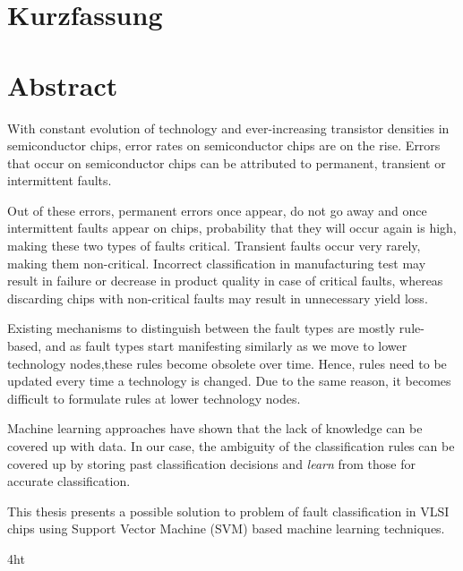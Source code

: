 \documentclass[
               paper=a4,
               BCOR1.92mm,DIV12,headinclude, %
               titlepage,
               bibliography=totoc,
               headsepline,
               cleardoublepage=empty,
               parskip=half,
	       pointlessnumbers, %
               final   %
               ]{scrreprt}
\let\ifdeutsch\iffalse
\begin{document}
\ifdeutsch
\chapter*{Kurzfassung}
\else
\chapter*{Abstract}
\fi
\begin{spacing}{1.2} 
With constant evolution of technology and ever-increasing transistor densities in semiconductor chips, error rates on semiconductor chips are on the rise. Errors that occur on semiconductor chips can be attributed to permanent, transient or intermittent faults.

Out of these errors, permanent errors once appear, do not go away and once intermittent faults appear on chips, probability that they will occur again is high, making these two types of faults critical. Transient faults occur very rarely, making them non-critical. Incorrect classification in manufacturing test may result in failure or decrease in product quality in case of critical faults, whereas discarding chips with non-critical faults may result in unnecessary yield loss.

Existing mechanisms to distinguish between the fault types are mostly rule-based, and as fault types start manifesting similarly as we move to lower technology nodes,these rules become obsolete over time. Hence, rules need to be updated every time a technology is changed. Due to the same reason, it becomes difficult to formulate rules at lower technology nodes.

Machine learning approaches have shown that the lack of knowledge can be covered up with data. In our case, the ambiguity of the classification rules can be covered up by storing past classification decisions and \emph{learn} from those for accurate classification. 

This thesis presents a possible solution to problem of fault classification in VLSI chips using Support Vector Machine (SVM) based machine learning techniques.


\end{spacing}
\cleardoublepage



\iftex4ht
\else
{}
\fi

%
%
\end{document}
